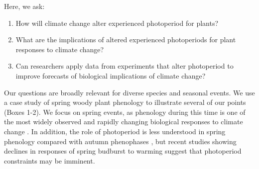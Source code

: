 \documentclass{article}
\begin{document}
\par Here, we ask: 
\begin{enumerate}
\item How will climate change alter experienced photoperiod for plants? 
\item What are the implications of altered experienced photoperiods for plant responses to climate change?
\item Can researchers apply data from experiments that alter photoperiod to improve forecasts of biological implications of climate change?

\end{enumerate}
\par Our questions are broadly relevant for diverse species and seasonal events. We use a case study of spring woody plant phenology to illustrate several of our points (Boxes 1-2). We focus on spring events, as phenology during this time is one of the most widely observed and rapidly changing biological responses to climate change \citep{parmesan2006}. In addition, the role of photoperiod is less understood in spring phenology compared with autumn phenophases \citep[reviewed in, e.g.,][]{azeez2015,gallinat2015,gill2015,lagercrantz2009, allona2008}, but recent studies showing declines in responses of spring budburst to warming \citep[e.g.,][]{fu2019,gusewell2017,yu2010} suggest that photoperiod constraints may be imminent. 
\end{document}
